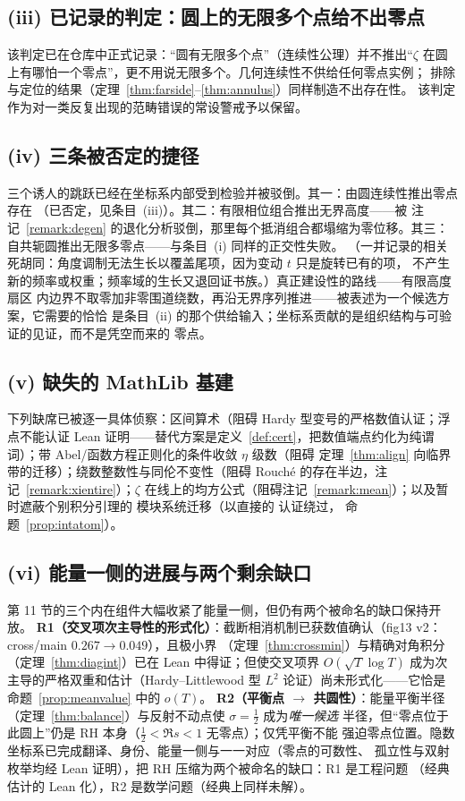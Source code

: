 \subsection*{(iii) 已记录的判定：圆上的无限多个点给不出零点}
该判定已在仓库中正式记录：“圆有无限多个点”（连续性公理）并不推出“$\zeta$
在圆上有哪怕一个零点”，更不用说无限多个。几何连续性不供给任何零点实例；
排除与定位的结果（定理~\ref{thm:farside}--\ref{thm:annulus}）同样制造不出存在性。
该判定作为对一类反复出现的范畴错误的常设警戒予以保留。

\subsection*{(iv) 三条被否定的捷径}
三个诱人的跳跃已经在坐标系内部受到检验并被驳倒。其一：由圆连续性推出零点存在
（已否定，见条目~(iii)）。其二：有限相位组合推出无界高度——被
注记~\ref{remark:degen} 的退化分析驳倒，那里每个抵消组合都塌缩为零位移。其三：
自共轭圆推出无限多零点——与条目~(i) 同样的正交性失败。
（一并记录的相关死胡同：角度调制无法生长以覆盖尾项，因为变动 $t$ 只是旋转已有的项，
不产生新的频率或权重；频率域的生长又退回证书族。）真正建设性的路线——有限高度扇区
内边界不取零加非零围道绕数，再沿无界序列推进——被表述为一个候选方案，它需要的恰恰
是条目~(ii) 的那个供给输入；坐标系贡献的是组织结构与可验证的见证，而不是凭空而来的
零点。

\subsection*{(v) 缺失的 MathLib 基建}
下列缺席已被逐一具体侦察：区间算术（阻碍 Hardy 型变号的严格数值认证；浮点不能认证
Lean 证明——替代方案是定义~\ref{def:cert}，把数值端点约化为纯谓词）；带
Abel/函数方程正则化的条件收敛 $\eta$ 级数（阻碍
定理~\ref{thm:align} 向临界带的迁移）；绕数整数性与同伦不变性（阻碍
Rouch\'e 的存在半边，注记~\ref{remark:xientire}）；$\zeta$
在线上的均方公式（阻碍注记~\ref{remark:mean}）；以及暂时遮蔽个别积分引理的
模块系统迁移（以直接的  认证绕过，
命题~\ref{prop:intatom}）。

\subsection*{(vi) 能量一侧的进展与两个剩余缺口}
第 11 节的三个内在组件大幅收紧了能量一侧，但仍有两个被命名的缺口保持开放。
\textbf{R1（交叉项次主导性的形式化）}：截断相消机制已获数值确认（fig13 v2：
cross/main $0.267\to0.049$），且极小界
（定理~\ref{thm:crossmin}）与精确对角积分
（定理~\ref{thm:diagint}）已在 Lean 中得证；但使交叉项界
$O(\sqrt{T}\log T)$ 成为次主导的严格双重和估计（Hardy--Littlewood 型 $L^2$
论证）尚未形式化——它恰是命题~\ref{prop:meanvalue} 中的 $o(T)$。
\textbf{R2（平衡点 $\to$ 共圆性）}：能量平衡半径
（定理~\ref{thm:balance}）与反射不动点使 $\sigma=\tfrac12$ 成为\emph{唯一候选}
半径，但“零点位于此圆上”仍是 RH 本身（$\tfrac12<\Re s<1$ 无零点）；仅凭平衡不能
强迫零点位置。隐数坐标系已完成翻译、身份、能量一侧与一一对应（零点的可数性、
孤立性与双射枚举均经 Lean 证明），把 RH 压缩为两个被命名的缺口：R1 是工程问题
（经典估计的 Lean 化），R2 是数学问题（经典上同样未解）。


